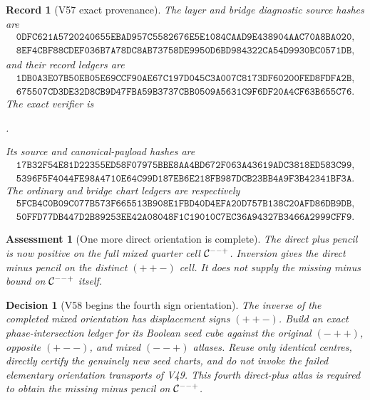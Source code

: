 \documentclass[11pt,oneside]{article}
\newtheorem{assessment}[theorem]{Assessment}
\newtheorem{record}[theorem]{Record}
\newtheorem{decision}[theorem]{Decision}
\theoremstyle{definition}
\theoremstyle{remark}
\begin{document}
\begin{record}[V57 exact provenance]
\label{rec:newv57-provenance}
The layer and bridge diagnostic source hashes are
\[
\begin{gathered}
\texttt{0DFC621A5720240655EBAD957C5582676E5E1084CAAD9E438904AAC70A8BA020},\\
\texttt{8EF4CBF88CDEF036B7A78DC8AB73758DE9950D6BD984322CA54D9930BC0571DB},
\end{gathered}
\]
and their record ledgers are
\[
\begin{gathered}
\texttt{1DB0A3E07B50EB05E69CCF90AE67C197D045C3A007C8173DF60200FED8FDFA2B},\\
\texttt{675507CD3DE32D8CB9D47FBA59B3737CBB0509A5631C9F6DF20A4CF63B655C76}.
\end{gathered}                                         \tag{57.12}
\]
The exact verifier is
\begin{center}
\footnotesize
{}.
\end{center}
Its source and canonical-payload hashes are
\[
\begin{gathered}
\texttt{17B32F54E81D22355ED58F07975BBE8AA4BD672F063A43619ADC3818ED583C99},\\
\texttt{5396F5F4044FE98A4710E64C99D187EB6E218FB987DCB23BB4A9F3B42341BF3A}.
\end{gathered}                                         \tag{57.13}
\]
The ordinary and bridge chart ledgers are respectively
\[
\begin{gathered}
\texttt{5FCB4C0B09C077B573F665513B908E1FBD40D4EFA20D757B138C20AFD86DB9DB},\\
\texttt{50FFD77DB447D2B89253EE42A08048F1C19010C7EC36A94327B3466A2999CFF9}.
\end{gathered}                                         \tag{57.14}
\]
\end{record}

\begin{assessment}[One more direct orientation is complete]
\label{ass:newv57}
The direct plus pencil is now positive on the full mixed quarter
cell \({\cal C}^{--+}\).  Inversion gives the direct minus pencil on
the distinct \((++-)\) cell.  It does not supply the missing minus
bound on \({\cal C}^{--+}\) itself.
\end{assessment}

\begin{decision}[V58 begins the fourth sign orientation]
\label{dec:newv57-next}
The inverse of the completed mixed orientation has displacement
signs \((++-)\).  Build an exact phase-intersection ledger for its
Boolean seed cube against the original \((-++)\), opposite
\((+--)\), and mixed \((--+)\) atlases.  Reuse only identical
centres, directly certify the genuinely new seed charts, and do
not invoke the failed elementary orientation transports of V49.
This fourth direct-plus atlas is required to obtain the missing
minus pencil on \({\cal C}^{--+}\).
\end{decision}
\end{document}
